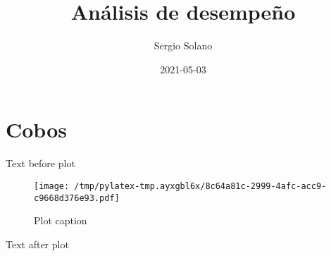 \documentclass{article}%
\title{Análisis de desempeño}%
\author{Sergio Solano}%
\date{2021{-}05{-}03}%
\begin{document}
%
\normalsize%
\maketitle%
\section{Cobos}%
\label{sec:Cobos}%
Text before plot%


\begin{figure}[htbp]%
\centering%
\texttt{[image: /tmp/pylatex-tmp.ayxgbl6x/8c64a81c-2999-4afc-acc9-c9668d376e93.pdf]}%
\caption{Plot caption}%
\end{figure}

%
Text after plot

%
\end{document}
